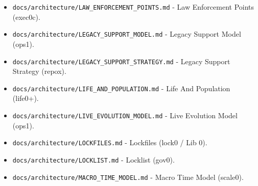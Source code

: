 \documentclass[9pt,a4paper,openany]{book}
\begin{document}
\begin{itemize}
\item \texttt{docs/\allowbreak{}architecture/\allowbreak{}LAW\_\allowbreak{}ENFORCEMENT\_\allowbreak{}POINTS.\allowbreak{}md} -\allowbreak{} Law Enforcement Points (exec0c).\allowbreak{}
\end{itemize}

\begin{itemize}
\item \texttt{docs/\allowbreak{}architecture/\allowbreak{}LEGACY\_\allowbreak{}SUPPORT\_\allowbreak{}MODEL.\allowbreak{}md} -\allowbreak{} Legacy Support Model (ops1).\allowbreak{}
\end{itemize}

\begin{itemize}
\item \texttt{docs/\allowbreak{}architecture/\allowbreak{}LEGACY\_\allowbreak{}SUPPORT\_\allowbreak{}STRATEGY.\allowbreak{}md} -\allowbreak{} Legacy Support Strategy (repox).\allowbreak{}
\end{itemize}

\begin{itemize}
\item \texttt{docs/\allowbreak{}architecture/\allowbreak{}LIFE\_\allowbreak{}AND\_\allowbreak{}POPULATION.\allowbreak{}md} -\allowbreak{} Life And Population (life0+).\allowbreak{}
\end{itemize}

\begin{itemize}
\item \texttt{docs/\allowbreak{}architecture/\allowbreak{}LIVE\_\allowbreak{}EVOLUTION\_\allowbreak{}MODEL.\allowbreak{}md} -\allowbreak{} Live Evolution Model (ops1).\allowbreak{}
\end{itemize}

\begin{itemize}
\item \texttt{docs/\allowbreak{}architecture/\allowbreak{}LOCKFILES.\allowbreak{}md} -\allowbreak{} Lockfiles (lock0 /\allowbreak{} Lib 0).\allowbreak{}
\end{itemize}

\begin{itemize}
\item \texttt{docs/\allowbreak{}architecture/\allowbreak{}LOCKLIST.\allowbreak{}md} -\allowbreak{} Locklist (gov0).\allowbreak{}
\end{itemize}

\begin{itemize}
\item \texttt{docs/\allowbreak{}architecture/\allowbreak{}MACRO\_\allowbreak{}TIME\_\allowbreak{}MODEL.\allowbreak{}md} -\allowbreak{} Macro Time Model (scale0).\allowbreak{}
\end{itemize}
\end{document}
